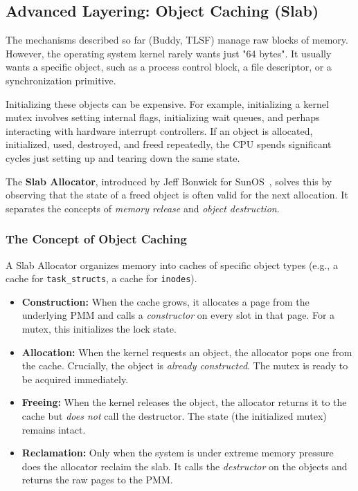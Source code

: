 \documentclass[a4paper,10pt,twoside]{report}
\theoremstyle{definition}
\begin{document}
\subsection{Advanced Layering: Object Caching (Slab)}

The mechanisms described so far (Buddy, TLSF) manage raw blocks of memory. However, the operating system kernel rarely wants just "64 bytes". It usually wants a specific object, such as a process control block, a file descriptor, or a synchronization primitive.

Initializing these objects can be expensive. For example, initializing a kernel mutex involves setting internal flags, initializing wait queues, and perhaps interacting with hardware interrupt controllers. If an object is allocated, initialized, used, destroyed, and freed repeatedly, the CPU spends significant cycles just setting up and tearing down the same state.

The \textbf{Slab Allocator}, introduced by Jeff Bonwick for SunOS~\cite{bonwick1994slab}, solves this by observing that the state of a freed object is often valid for the next allocation. It separates the concepts of \textit{memory release} and \textit{object destruction}.

\subsubsection{The Concept of Object Caching}
A Slab Allocator organizes memory into caches of specific object types (e.g., a cache for \texttt{task\_structs}, a cache for \texttt{inodes}).
\begin{itemize}
    \item \textbf{Construction:} When the cache grows, it allocates a page from the underlying PMM and calls a \textit{constructor} on every slot in that page. For a mutex, this initializes the lock state.
    \item \textbf{Allocation:} When the kernel requests an object, the allocator pops one from the cache. Crucially, the object is \textit{already constructed}. The mutex is ready to be acquired immediately.
    \item \textbf{Freeing:} When the kernel releases the object, the allocator returns it to the cache but \textit{does not} call the destructor. The state (the initialized mutex) remains intact.
    \item \textbf{Reclamation:} Only when the system is under extreme memory pressure does the allocator reclaim the slab. It calls the \textit{destructor} on the objects and returns the raw pages to the PMM.
\end{itemize}
\end{document}
